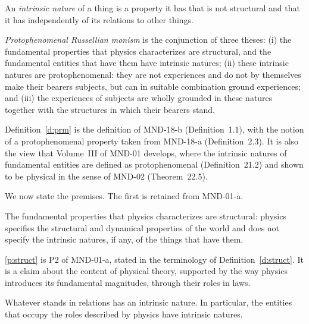 \documentclass{situationist-preprint}
\begin{document}
\begin{definition}\label{d:nature}
An \emph{intrinsic nature} of a thing is a property it has that is not structural and that it has independently of its relations to other things.
\end{definition}

\begin{definition}\label{d:prm}
\emph{Protophenomenal Russellian monism} is the conjunction of three theses: (i) the fundamental properties that physics characterizes are structural, and the fundamental entities that have them have intrinsic natures; (ii) these intrinsic natures are protophenomenal: they are not experiences and do not by themselves make their bearers subjects, but can in suitable combination ground experiences; and (iii) the experiences of subjects are wholly grounded in these natures together with the structures in which their bearers stand.
\end{definition}

Definition~\ref{d:prm} is the definition of MND-18-b (Definition~1.1), with the notion of a protophenomenal property taken from MND-18-a (Definition~2.3). It is also the view that Volume~III of MND-01 develops, where the intrinsic natures of fundamental entities are defined as protophenomenal (Definition~21.2) and shown to be physical in the sense of MND-02 (Theorem~22.5).

We now state the premises. The first is retained from MND-01-a.

\begin{principle}[Structuralism]\label{p:struct}
The fundamental properties that physics characterizes are structural: physics specifies the structural and dynamical properties of the world and does not specify the intrinsic natures, if any, of the things that have them.
\end{principle}

\ref{p:struct} is P2 of MND-01-a, stated in the terminology of Definition~\ref{d:struct}. It is a claim about the content of physical theory, supported by the way physics introduces its fundamental magnitudes, through their roles in laws.

\begin{principle}[Relata]\label{p:relata}
Whatever stands in relations has an intrinsic nature. In particular, the entities that occupy the roles described by physics have intrinsic natures.
\end{principle}
\end{document}
